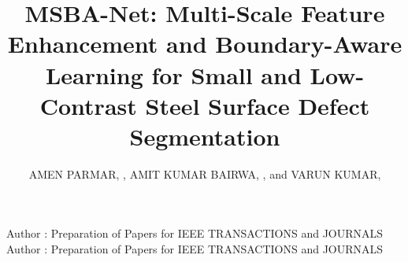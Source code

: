 \documentclass{ieeeaccess}
\begin{document}

\title{MSBA-Net: Multi-Scale Feature Enhancement and Boundary-Aware Learning for Small and Low-Contrast Steel Surface Defect Segmentation}

\author{\uppercase{Amen Parmar}, ,
\uppercase{Amit Kumar Bairwa}, ,
and \uppercase{Varun Kumar}, }

\address[1]{Department of Computer Science and Engineering, Manipal University Jaipur, Jaipur, Rajasthan 303007, India}

\markboth
{Author \headeretal: Preparation of Papers for IEEE TRANSACTIONS and JOURNALS}
{Author \headeretal: Preparation of Papers for IEEE TRANSACTIONS and JOURNALS}

\end{document}
